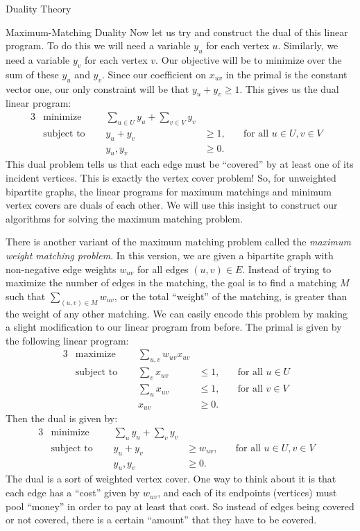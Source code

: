 \begin{section}{Duality Theory}
\begin{subsection}{Maximum-Matching Duality}
	Now let us try and construct the dual of this linear program. To do this we will need a variable 
	$y_u$ for each vertex $u$. Similarly, we need a variable $y_v$ for each vertex $v$. Our 
	objective will be to minimize over the sum of these $y_u$ and $y_v$. Since our coefficient on 
	$x_{uv}$
	in the primal is the constant vector one, our only constraint will be that $y_u + y_v \geq 1$. 
	This gives us the dual linear program:
	\begin{alignat}{3}
		& \text{minimize } & \sum_{u\in U} y_u + \sum_{v\in V} y_v& \\
		& \text{subject to } \quad & y_u + y_v & \geq 1, & \quad \text{for all } 
					u\in U,v\in V & \\
				    && y_u,y_v & \geq 0.
	\end{alignat}
	This dual problem tells us that each edge must be ``covered'' by at least one of its incident 
	vertices. This is exactly the vertex cover problem! So, for unweighted bipartite graphs, the 
	linear programs for maximum matchings and minimum vertex covers are duals of each other. 
	We will use this insight to construct our algorithms for solving the maximum matching problem. 

	There is another variant of the maximum matching problem called the 
	\emph{maximum weight matching problem}. In this 
	version, we are given a bipartite graph with non-negative edge weights $w_{uv}$ for all 
	edges $(u,v)\in E$. Instead of trying to maximize the number of edges in the matching, the goal 
	is to find a matching $M$ such that $\sum_{(u,v) \in M} w_{uv}$, or the total ``weight'' of the 
	matching, is greater than the weight of any other matching. 
	We can easily encode this problem by making 
	a slight modification to our linear program from before. The primal is given by the following 
	linear program:
	\begin{alignat}{3}
		& \text{maximize } & \sum_{u,v} w_{uv}x_{uv}& \\
		& \text{subject to } \quad & \sum_{v} x_{uv} & \leq 1, & \quad 
					\text{for all } u\in U& \\
				     &\quad & \sum_{u} x_{uv} & \leq 1, & \quad 
				     	\text{for all } v\in V & \\
				&& x_{uv} & \geq 0.
	\end{alignat}
	Then the dual is given by:
	\begin{alignat}{3}
		& \text{minimize } & \sum_{u} y_u + \sum_v y_v& \\
		& \text{subject to } \quad & y_u + y_v & \geq w_{uv}, & \quad \text{for all } u\in U,
					v\in V & \\
				    && y_u,y_v & \geq 0.
	\end{alignat}
	The dual is a sort of weighted vertex cover. One way to think about it is that each edge 
	has a ``cost'' given by $w_{uv}$, and each of its endpoints (vertices) must pool ``money'' 
	in order 
	to pay at least that cost. So instead of edges being covered or not covered, there is a certain 
	``amount'' that they have to be covered.


\end{subsection}
\end{section}
